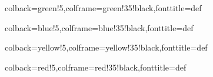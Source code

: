 \usepackage[margin=1in]{geometry}
\usepackage[utf8]{inputenc}
\usepackage{textcomp}
\usepackage{amssymb}
\usepackage{natbib}
\usepackage{graphicx}
\usepackage{gensymb}
\usepackage{amsthm, amsmath, mathtools}
\usepackage{xcolor}
\usepackage{enumerate}
\usepackage{framed}
\usepackage{tcolorbox}

\newcommand{\R}{\mathbb{R}}
\newcommand{\Z}{\mathbb{Z}}
\newcommand{\N}{\mathbb{N}}
\newcommand{\Q}{\mathbb{Q}}
\newcommand{\code}[1]{\texttt{#1}}
\newcommand{\mdiamond}{$\diamondsuit$}

\newtheorem*{proposition}{Proposition}

{colback=green!5,colframe=green!35!black,fonttitle=\bfseries}{def}

{colback=blue!5,colframe=blue!35!black,fonttitle=\bfseries}{def}

{colback=yellow!5,colframe=yellow!35!black,fonttitle=\bfseries}{def}

{colback=red!5,colframe=red!35!black,fonttitle=\bfseries}{def}